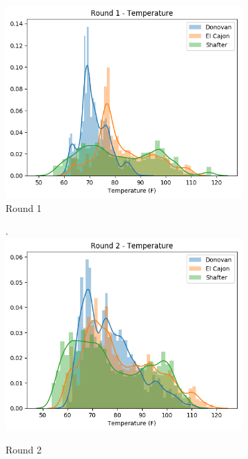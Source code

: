 \documentclass[journal abbreviation, manuscript]{copernicus}
\begin{document}
\begin{figure}[H]
\centering
\begin{subfigure}{0.32\textwidth}
\includegraphics[width=\textwidth]{results/distributions/round1_temperature.png}
\caption{Round 1}
\end{subfigure}
\begin{subfigure}{0.32\textwidth}
.\includegraphics[width=\textwidth]{results/distributions/round2_temperature.png}
\caption{Round 2}
\end{subfigure}
\begin{subfigure}{0.32\textwidth}

\end{subfigure}
\end{figure}
\end{document}
